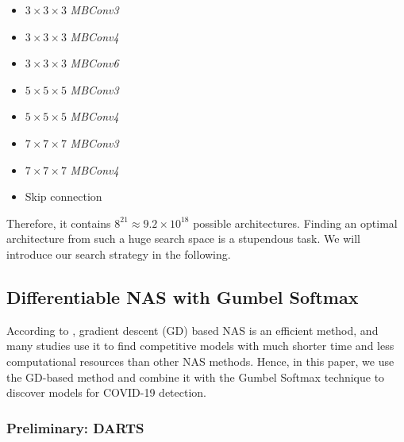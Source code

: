 \documentclass[letterpaper]{article}
\begin{document}
\begin{multicols}{2}
\begin{itemize}
    \item $3\times3\times3$ \textit{MBConv3}  
    \item $3\times3\times3$ \textit{MBConv4}
    \item $3\times3\times3$ \textit{MBConv6}
    \item $5\times5\times5$ \textit{MBConv3}
    \item $5\times5\times5$ \textit{MBConv4}
    \item $7\times7\times7$ \textit{MBConv3}
    \item $7\times7\times7$ \textit{MBConv4}
    \item Skip connection
\end{itemize}
\end{multicols}

Therefore, it contains $8^{21}\approx 9.2\times10^{18}$ possible architectures. Finding an optimal architecture from such a huge search space is a stupendous task. We will introduce our search strategy in the following.

\subsection{Differentiable NAS with Gumbel Softmax}


According to \cite{automl_survey}, gradient descent (GD) based NAS is an efficient method, and many studies use it to find competitive models with much shorter time and less computational resources \cite{gdas,fbnet} than other NAS methods. Hence, in this paper, we use the GD-based method and combine it with the Gumbel Softmax \cite{Gumbel_Softmax} technique to discover models for COVID-19 detection.

\subsubsection{Preliminary: DARTS}
\end{document}
